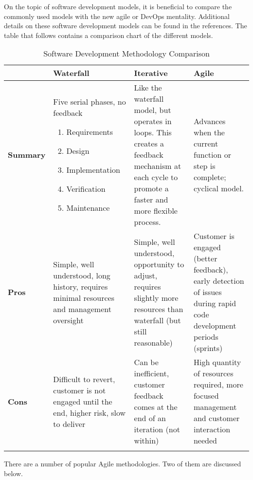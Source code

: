 On the topic of software development models, it is beneficial to compare the
commonly used models with the new agile or DevOps mentality. Additional
details on these software development models can be found in the references. 
The table that follows contains a comparison chart of the different models.

\begin{longtable}{KJJJ}
\toprule
&
\textbf{Waterfall}
&
\textbf{Iterative}
&
\textbf{Agile}
\\ \midrule
\textbf{Summary}
&
Five serial phases, no feedback
\begin{enumerate}
  \item Requirements
  \item Design
  \item Implementation
  \item Verification
  \item Maintenance
\end{enumerate}
&
Like the waterfall model, but operates in loops. This creates a feedback
mechanism at each cycle to promote a faster and more flexible process.
&
Advances when the current function or step is complete; cyclical model.
\\ \midrule
\textbf{Pros}
&
Simple, well understood, long history, requires minimal resources and management
oversight
&
Simple, well understood, opportunity to adjust, requires slightly more
resources than waterfall (but still reasonable)
&
Customer is engaged (better feedback), early detection of issues during rapid
code development periods (sprints)
\\ \midrule
\textbf{Cons}
&
Difficult to revert, customer is not engaged until the end, higher risk, slow
to deliver
&
Can be inefficient, customer feedback comes at the end of an iteration (not within)
&
High quantity of resources required, more focused management and customer
interaction needed
\\
\bottomrule
\caption{Software Development Methodology Comparison}
\end{longtable}

There are a number of popular Agile methodologies. Two of them are discussed below.

